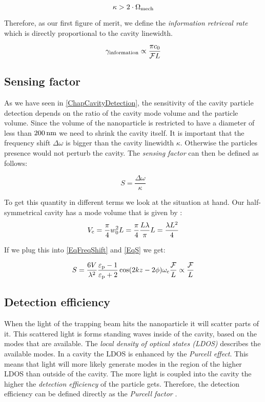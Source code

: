 \begin{equation}
	\kappa > 2\cdot\de{\Omega}{mech}
\end{equation}

Therefore, as our first figure of merit, we define the \textit{information retrieval rate} which is directly proportional to the cavity linewidth.

\begin{equation}
	\de{\gamma}{information}\propto \frac{\pi c_0}{\mathcal{F}L}
\end{equation}

\subsection{Sensing factor}\label{ChapSensingFactor}
As we have seen in \autoref{ChapCavityDetection}, the sensitivity of the cavity particle detection depends on the ratio of the cavity mode volume and the particle volume. Since the volume of the nanoparticle is restricted to have a diameter of less than $200\nm$ we need to shrink the cavity itself. It is important that the frequency shift $\Delta\omega$ is bigger than the cavity linewidth $\kappa$. Otherwise the particles presence would not perturb the cavity. The \textit{sensing factor} can then be defined as follows:

\begin{equation}\label{EqS}
	S=\frac{\Delta\omega}{\kappa}
\end{equation}

To get this quantity in different terms we look at the situation at hand. Our half-symmetrical cavity has a mode volume that is given by \cite[p.~752]{siegman1986lasers}:
\begin{equation}
	\de{V}{c}=\frac{\pi}{4}w_0^2L=\frac{\pi}{4}\frac{L\lambda}{\pi}L=\frac{\lambda L^2}{4}
\end{equation}

If we plug this into \autoref{EqFreqShift} and \autoref{EqS} we get:

\begin{equation}\label{EqSensingFactor}
	S=\frac{6V}{\lambda^2}\frac{\de{\varepsilon}{p}-1}{\de{\varepsilon}{p}+2}\cos(2kz-2\phi)\de{\omega}{c}\frac{\mathcal{F}}{L}\propto\frac{\mathcal{F}}{L}
\end{equation}

\subsection{Detection efficiency}
When the light of the trapping beam hits the nanoparticle it will scatter parts of it. This scattered light is forms standing waves inside of the cavity, based on the modes that are available. The \textit{local density of optical states (LDOS)} describes the available modes. In a cavity the LDOS is enhanced by the \textit{Purcell effect}. This means that light will more likely generate modes in the region of the higher LDOS than outside of the cavity. The more light is coupled into the cavity the higher the \textit{detection efficiency} of the particle gets. Therefore, the detection efficiency can be defined directly as the \textit{Purcell factor} \cite{dowling1991radiation}.

